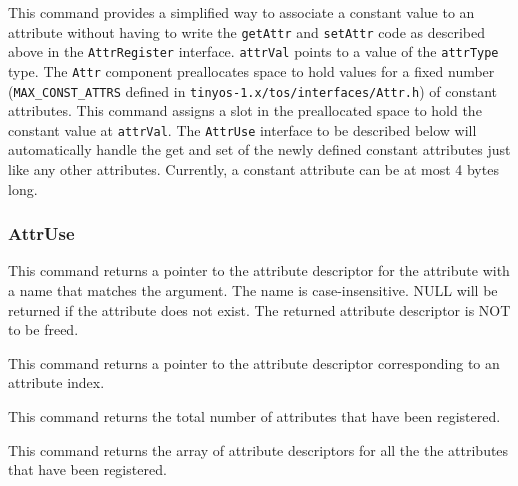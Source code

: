 \documentclass[11pt]{article}
\newcommand{\docroot}{tinyos-1.x}
\begin{document}

This command provides a simplified way to associate a constant value to an
attribute without having to write the {\tt getAttr} and {\tt setAttr} code
as described above in the {\tt AttrRegister} interface.  {\tt attrVal} points
to a value of the {\tt attrType} type.  The {\tt Attr}
component preallocates space to hold values for a fixed number
({\tt MAX\_CONST\_ATTRS} defined in {\tt \docroot/tos/interfaces/Attr.h})
of constant attributes.  This command assigns a slot in the preallocated
space to hold the constant value at {\tt attrVal}.  The {\tt AttrUse}
interface to be described below will automatically handle the get and set
of the newly defined constant attributes just like any other attributes.
Currently, a constant attribute can be at most 4 bytes long.

\subsubsection{AttrUse}
\label{sec:attruse}


This command returns a pointer to the attribute descriptor
for the attribute with a name that matches the argument.
The name is case-insensitive.
NULL will be returned if the attribute does not exist.
The returned attribute descriptor is NOT to be freed.



This command returns a pointer to the attribute descriptor
corresponding to an attribute index.



This command returns the total number of attributes that have been registered.



This command returns the array of attribute descriptors for all the
the attributes that have been registered.


\end{document}
